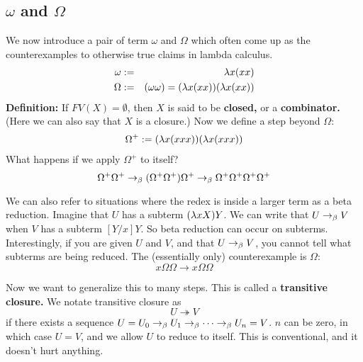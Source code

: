 \subsection{$\omega$ and $\Omega$}
We now introduce a pair of term $\omega$ and $\Omega$ which often come up as the counterexamples to otherwise true claims in lambda calculus.
\begin{eqnarray*}
  \omega &:=& \lambda x (xx)\\
  \Omega &:=& (\omega\omega) = (\lambda x(xx))(\lambda x(xx))
\end{eqnarray*}
\textbf{Definition:} If $FV(X) = \emptyset$, then $X$ is said to be \textbf{closed,} or a \textbf{combinator.} (Here we can also say that $X$ is a closure.) Now we define a step beyond $\Omega$:
\begin{eqnarray*}
  \Omega^+ := (\lambda x (xxx))(\lambda x (xxx))
\end{eqnarray*}
What happens if we apply $\Omega^+$ to itself?
\begin{equation*}
  \Omega^+\Omega^+ \rightarrow_\beta (\Omega^+\Omega^+)\Omega^+ \rightarrow_\beta \Omega^+\Omega^+\Omega^+\Omega^+
\end{equation*}

We can also refer to situations where the redex is inside a larger term as a beta reduction. Imagine that $U$ has a subterm $(\lambda x X)Y$. We can write that $U \rightarrow_\beta V$ when $V$ has a subterm $[Y/x]Y$. So beta reduction can occur on subterms.\\

Interestingly, if you are given $U$ and $V$, and that $U \rightarrow_\beta V$, you cannot tell what subterms are being reduced. The (essentially only) counterexample is $\Omega$:
\begin{equation*}
  x\Omega\Omega \rightarrow x\Omega\Omega
\end{equation*}

Now we want to generalize this to many steps. This is called a \textbf{transitive closure.} We notate transitive closure as
\begin{equation*}
  U \twoheadrightarrow V
\end{equation*}
if there exists a sequence $U = U_0 \rightarrow_\beta U_1 \rightarrow_\beta \cdots \rightarrow_\beta U_n = V$. $n$ can be zero, in which case $U = V$, and we allow $U$ to reduce to itself. This is conventional, and it doesn't hurt anything.\\

